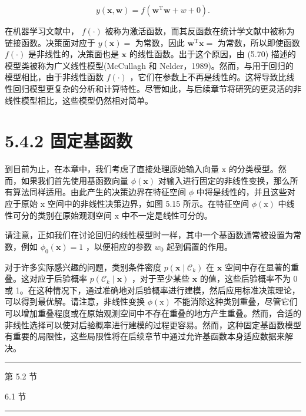 \documentclass[10pt]{report}
\newcommand{\HRule}{\begin{center}\rule{0.9\linewidth}{0.2mm}\end{center}}
\begin{document}
\[
y\left( {\mathbf{x},\mathbf{w}}\right)  = f\left( {{\mathbf{w}}^{\mathrm{T}}\mathbf{w} + w + 0}\right) . \tag{5.70}
\]

在机器学习文献中， \(f\left( \cdot \right)\) 被称为激活函数，而其反函数在统计学文献中被称为链接函数。决策面对应于 \(y\left( \mathbf{x}\right)  =\) 为常数，因此 \({\mathbf{w}}^{\mathrm{T}}\mathbf{x} =\) 为常数，所以即使函数 \(f\left( \cdot \right)\) 是非线性的，决策面也是 \(\mathbf{x}\) 的线性函数。出于这个原因，由 (5.70) 描述的模型类被称为广义线性模型(McCullagh 和 Nelder，1989)。然而，与用于回归的模型相比，由于非线性函数 \(f\left( \cdot \right)\) ，它们在参数上不再是线性的。这将导致比线性回归模型更复杂的分析和计算特性。尽管如此，与后续章节将研究的更灵活的非线性模型相比，这些模型仍然相对简单。

\section*{5.4.2 固定基函数}

到目前为止，在本章中，我们考虑了直接处理原始输入向量 \(\mathrm{x}\) 的分类模型。然而，如果我们首先使用基函数向量 \(\phi \left( \mathbf{x}\right)\) 对输入进行固定的非线性变换，那么所有算法同样适用。由此产生的决策边界在特征空间 \(\phi\) 中将是线性的，并且这些对应于原始 \(\mathrm{x}\) 空间中的非线性决策边界，如图 5.15 所示。在特征空间 \(\phi \left( \mathrm{x}\right)\) 中线性可分的类别在原始观测空间 \(\mathrm{x}\) 中不一定是线性可分的。

请注意，正如我们在讨论回归的线性模型时一样，其中一个基函数通常被设置为常数，例如 \({\phi }_{0}\left( \mathbf{x}\right)  = 1\) ，以便相应的参数 \({w}_{0}\) 起到偏置的作用。

对于许多实际感兴趣的问题，类别条件密度 \(p\left( {\mathbf{x} \mid  {\mathcal{C}}_{k}}\right)\) 在 \(\mathbf{x}\) 空间中存在显著的重叠。这对应于后验概率 \(p\left( {{\mathcal{C}}_{k} \mid  \mathbf{x}}\right)\) ，对于至少某些 \(\mathbf{x}\) 的值，这些后验概率不为 0 或 1。在这种情况下，通过准确地对后验概率进行建模，然后应用标准决策理论，可以得到最优解。请注意，非线性变换 \(\phi \left( \mathrm{x}\right)\) 不能消除这种类别重叠，尽管它们可以增加重叠程度或在原始观测空间中不存在重叠的地方产生重叠。然而，合适的非线性选择可以使对后验概率进行建模的过程更容易。然而，这种固定基函数模型有重要的局限性，这些局限性将在后续章节中通过允许基函数本身适应数据来解决。

\HRule

第 5.2 节

6.1 节

\HRule
\end{document}
